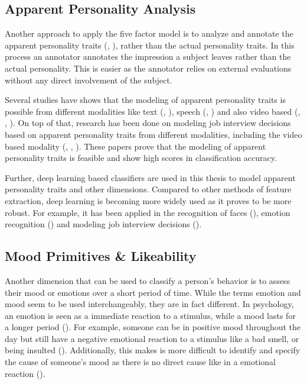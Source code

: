 \subsection{Apparent Personality Analysis}

Another approach to apply the five factor model is to analyze and annotate the apparent personality traits (\cite{junior2018first}, \cite{chen2016overcoming}), rather than the actual personality traits. In this process an annotator annotates the impression a subject leaves rather than the actual personality. This is easier as the annotator relies on external evaluations without any direct involvement of the subject. 

Several studies have shows that the modeling of apparent personality traits is possible from different modalities like text (\cite{gievska2014impact}, \cite{alam2013personality}), speech (\cite{valente2012annotation}, \cite{madzlan2014towards}) and also video based (\cite{junior2018first}, \cite{qin2016modern}, \cite{escalante2020modeling}). On top of that, research has been done on modeling job interview decisions based on apparent personality traits from different modalities, including the video based modality (\cite{kaya2017multi}, \cite{kaya2018multimodal}, \cite{yu2019multimodal}). These papers prove that the modeling of apparent personality traits is feasible and show high scores in classification accuracy. 

Further, deep learning based classifiers are used in this thesis to model apparent personality traits and other dimensions. Compared to other methods of feature extraction, deep learning is becoming more widely used as it proves to be more robust. For example, it has been applied in the recognition of faces (\cite{parkhi2015deep}), emotion recognition (\cite{kaya2017video}) and modeling job interview decisions (\cite{kaya2018multimodal}). 

\subsection{Mood Primitives \& Likeability}
Another dimension that can be used to classify a person's behavior is to assess their mood or emotions over a short period of time. While the terms emotion and mood seem to be used interchangeably, they are in fact different. In psychology, an emotion is seen as a immediate reaction to a stimulus, while a mood lasts for a longer period (\cite{bower2000affectmemory}). For example, someone can be in positive mood throughout the day but still have a negative emotional reaction to a stimulus like a bad smell, or being insulted (\cite{matlin2012cognition}). Additionally, this makes is more difficult to identify and specify the cause of someone's mood as there is no direct cause like in a emotional reaction (\cite{desmet2016mood}).

